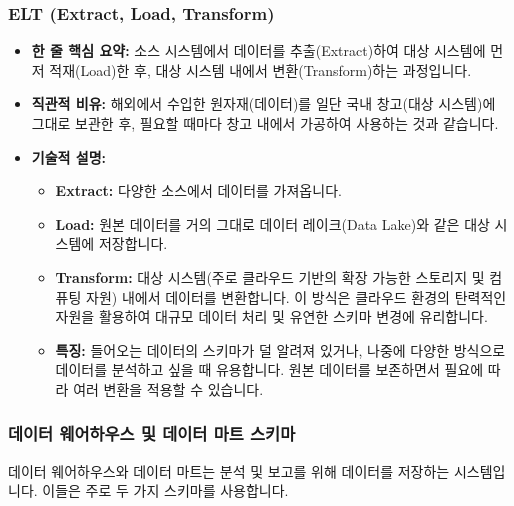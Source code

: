 \documentclass[11pt,a4paper]{article}
\begin{document}
\subsubsection{ELT (Extract, Load, Transform)}
\begin{itemize}
    \item \textbf{한 줄 핵심 요약:} 소스 시스템에서 데이터를 추출(Extract)하여 대상 시스템에 먼저 적재(Load)한 후, 대상 시스템 내에서 변환(Transform)하는 과정입니다.
    \item \textbf{직관적 비유:} 해외에서 수입한 원자재(데이터)를 일단 국내 창고(대상 시스템)에 그대로 보관한 후, 필요할 때마다 창고 내에서 가공하여 사용하는 것과 같습니다.
    \item \textbf{기술적 설명:}
    \begin{itemize}
        \item \textbf{Extract:} 다양한 소스에서 데이터를 가져옵니다.
        \item \textbf{Load:} 원본 데이터를 거의 그대로 데이터 레이크(Data Lake)와 같은 대상 시스템에 저장합니다.
        \item \textbf{Transform:} 대상 시스템(주로 클라우드 기반의 확장 가능한 스토리지 및 컴퓨팅 자원) 내에서 데이터를 변환합니다. 이 방식은 클라우드 환경의 탄력적인 자원을 활용하여 대규모 데이터 처리 및 유연한 스키마 변경에 유리합니다.
        \item \textbf{특징:} 들어오는 데이터의 스키마가 덜 알려져 있거나, 나중에 다양한 방식으로 데이터를 분석하고 싶을 때 유용합니다. 원본 데이터를 보존하면서 필요에 따라 여러 변환을 적용할 수 있습니다.
    \end{itemize}
\end{itemize}

\subsubsection{데이터 웨어하우스 및 데이터 마트 스키마}
데이터 웨어하우스와 데이터 마트는 분석 및 보고를 위해 데이터를 저장하는 시스템입니다. 이들은 주로 두 가지 스키마를 사용합니다.
\end{document}
